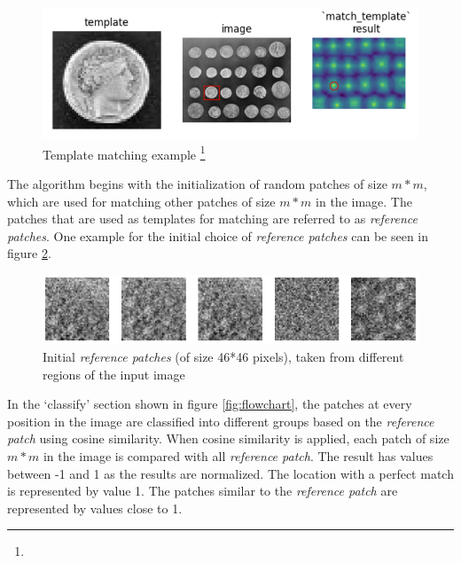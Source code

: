 \documentclass[fleqn,10pt]{wlscirep}
\begin{document}
	\begin{figure}
		\centering
		\includegraphics[scale=0.8]{./imgs/template_matching.png}
		\caption[Template matching example]{Template matching example \footnote{\footnotemark} }
		\label{fig:template_matching}
	\end{figure} 
	
	
	
	
	The algorithm begins with the initialization of random patches of size $m*m$, which are used for matching other patches of size $m*m$ in the image. The patches that are used as templates for matching are referred to as \textit{reference patches}. One example for the initial choice of \textit{reference patches} can be seen in figure \ref{fig:initial_reference_patches}. 
	
	\begin{figure}
		\centering
		\includegraphics[scale=0.75]{./imgs/initial_reference_patches.png}
		\caption[Initial \textit{reference patches}]{Initial \textit{reference patches} (of size 46*46 pixels), taken from different regions of the input image}
		\label{fig:initial_reference_patches}
	\end{figure} 
	
	In the `classify'  section shown in figure \ref{fig:flowchart}, the patches at every position in the image are classified into different groups based on the \textit{reference patch} using cosine similarity. When cosine similarity is applied, each patch of size $m*m$ in the image is compared with all \textit{reference patch}. The result has values between -1 and 1 as the results are normalized. The location with a perfect match is represented by value 1. The patches similar to the \textit{reference patch} are represented by values close to 1. 
	
\end{document}
